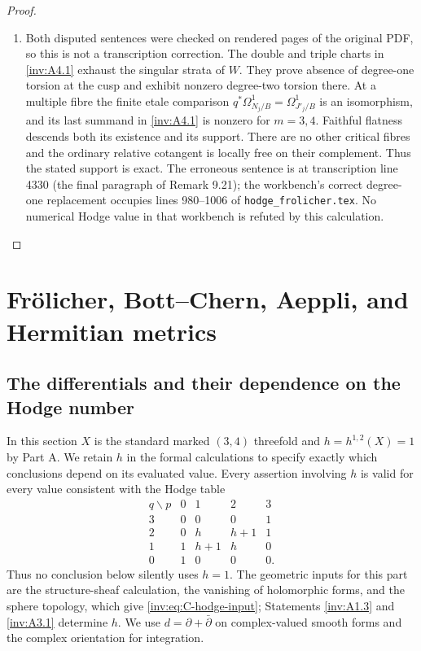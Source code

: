\begin{proof}
\begin{enumerate}[label=\arabic*.,leftmargin=*]
\item Both disputed sentences were checked on rendered pages of the
original PDF, so this is not a transcription correction.  The
double and triple charts in \ref{inv:A4.1} exhaust the singular strata of
$W$.  They prove absence of degree-one torsion at the cusp and
exhibit nonzero degree-two torsion there.  At a multiple fibre the
finite etale comparison
$q^*\Omega^1_{N_j/B}=\Omega^1_{J'_j/B}$ is an isomorphism,
and its last summand in \ref{inv:A4.1} is nonzero for $m=3,4$.
Faithful flatness descends both its existence and its support.
There are no other critical fibres and the ordinary relative
cotangent is locally free on their complement.  Thus the stated
support is exact.  The erroneous sentence is at transcription
line 4330 (the final paragraph of Remark 9.21); the workbench's
correct degree-one replacement occupies lines 980--1006 of
\texttt{hodge\_frolicher.tex}.  No numerical Hodge value in that
workbench is refuted by this calculation.
\end{enumerate}
\end{proof}



\section{Fr\"olicher, Bott--Chern, Aeppli, and Hermitian metrics}
\label{inv:sec:partC}

\subsection{The differentials and their dependence on the Hodge number}

In this section $X$ is the standard marked $(3,4)$ threefold and
$h=h^{1,2}(X)=1$ by Part A.  We retain $h$ in the formal calculations
to specify exactly which conclusions depend on its evaluated value.
Every assertion involving $h$ is valid for every value
consistent with the Hodge table
\begin{equation}\label{inv:eq:C-hodge-input}
\begin{array}{c|rrrr}
q\backslash p&0&1&2&3\\\hline
3&0&0&0&1\\
2&0&h&h+1&1\\
1&1&h+1&h&0\\
0&1&0&0&0.
\end{array}
\end{equation}
Thus no conclusion below silently uses $h=1$.  The geometric inputs for
this part are the structure-sheaf calculation, the vanishing of
holomorphic forms, and the sphere topology, which give
\eqref{inv:eq:C-hodge-input}; Statements \ref{inv:A1.3} and \ref{inv:A3.1} determine $h$.
We use $d=\partial+\bar\partial$ on complex-valued
smooth forms and the complex orientation for integration.

